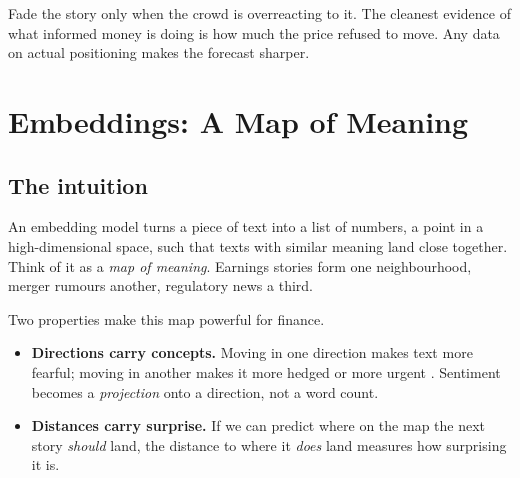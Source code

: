 \documentclass[11pt,a4paper]{article}
\theoremstyle{plain}
\theoremstyle{definition}
\begin{document}
\begin{plainwords}
Fade the story only when the crowd is overreacting to it. The cleanest evidence of what informed money is doing is how much the price refused to move. Any data on actual positioning makes the forecast sharper.
\end{plainwords}

\section{Embeddings: A Map of Meaning}\label{sec:embeddings}

\subsection{The intuition}

An embedding model turns a piece of text into a list of numbers, a point in a high-dimensional space, such that texts with similar meaning land close together. Think of it as a \emph{map of meaning}. Earnings stories form one neighbourhood, merger rumours another, regulatory news a third.

Two properties make this map powerful for finance.
\begin{itemize}
  \item \textbf{Directions carry concepts.} Moving in one direction makes text more fearful; moving in another makes it more hedged or more urgent \citep{park2023}. Sentiment becomes a \emph{projection} onto a direction, not a word count.
  \item \textbf{Distances carry surprise.} If we can predict where on the map the next story \emph{should} land, the distance to where it \emph{does} land measures how surprising it is.
\end{itemize}
\end{document}
